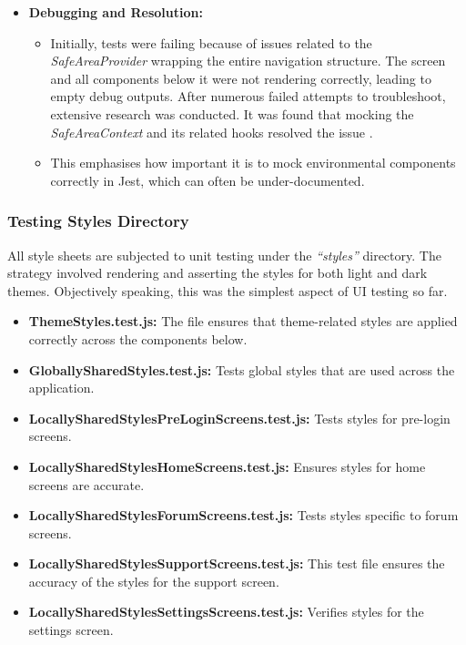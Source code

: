 \begin{itemize}
    \item \textbf{Debugging and Resolution:}
    \begin{itemize}
        \item Initially, tests were failing because of issues related to the \textit{SafeAreaProvider} wrapping the entire navigation structure. The screen and all components below it were not rendering correctly, leading to empty debug outputs. After numerous failed attempts to troubleshoot, extensive research was conducted. It was found that mocking the \textit{SafeAreaContext} and its related hooks resolved the issue \cite{StackOverflowSafeAreaContextIssue2021, GithubSafeAreaContextIssue2019}.
        \item This emphasises how important it is to mock environmental components correctly in Jest, which can often be under-documented.
    \end{itemize}
\end{itemize}

\subsubsection{Testing Styles Directory}

All style sheets are subjected to unit testing under the \textit{``styles''} directory. The strategy involved rendering and asserting the styles for both light and dark themes. Objectively speaking, this was the simplest aspect of UI testing so far.

\begin{itemize}
    \item \textbf{ThemeStyles.test.js:} The file ensures that theme-related styles are applied correctly across the components below.
    \item \textbf{GloballySharedStyles.test.js:} Tests global styles that are used across the application.
    \item \textbf{LocallySharedStylesPreLoginScreens.test.js:} Tests styles for pre-login screens.
    \item \textbf{LocallySharedStylesHomeScreens.test.js:} Ensures styles for home screens are accurate.
    \item \textbf{LocallySharedStylesForumScreens.test.js:} Tests styles specific to forum screens.
    \item \textbf{LocallySharedStylesSupportScreens.test.js:} This test file ensures the accuracy of the styles for the support screen.
    \item \textbf{LocallySharedStylesSettingsScreens.test.js:} Verifies styles for the settings screen.
\end{itemize}

